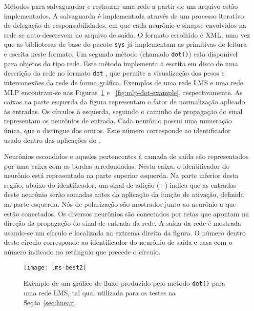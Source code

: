Métodos para salvaguardar e restaurar uma rede a partir de um arquivo es\-tão
implementados. A salvaguarda é implementada através de um processo iterativo
de delegação de responsabilidades, em que cada neurônio e sinapse envolvidos na
rede se auto-descrevem no arquivo de saída. O formato escolhido é XML, uma vez
que as bibliotecas de base do pacote \texttt{sys} já implementam as primitivas
de leitura e escrita neste formato. Um segundo método (chamado \texttt{dot()})
está disponível para objetos do tipo rede. Este método implementa a
escrita em disco de uma descrição da rede no formato \texttt{dot}
\cite{graphviz}, que permite a visualização dos pesos e interconexões da rede
de forma gráfica. Exemplos de uma rede LMS e uma rede MLP encontram-se nas
Figuras~\ref{fig:lms-dot-example} e ~\ref{fig:mlp-dot-example},
respectivamente. As caixas na parte esquerda da figura representam o fator de
normalização aplicado às entradas. Os círculos à esquerda, seguindo o caminho
de propagação do sinal representam os neurônios de entrada. Cada neurônio
possui uma numeração única, que o distingue dos outros. Este número
corresponde ao identificador usado dentro das aplicações do
. 

Neurônios escondidos e aqueles pertencentes à camada de saída são
representados por uma caixa com as bordas arredondadas. Nesta caixa, o
identificador do neurônio está representado na parte superior esquerda. Na
parte inferior desta região, abaixo do identificador, um sinal de adição ($+$)
indica que as entradas deste neurônio serão somadas antes da aplicação da
função de ativação, definida na parte esquerda. Nós de polarização são
mostrados junto ao neurônio a que estão conectados. Os diversos neurônios são
conectados por retas que apontam na direção da propagação do sinal de entrada
da rede. A saída da rede é mostrada usando-se um círculo e localizada na
extrema direita da figura. O número dentro deste círculo corresponde ao
identificador do neurônio de saída e casa com o número indicado no retângulo que
precede o círculo.

\begin{figure}
\begin{center}
\texttt{[image: lms-best2]}
\end{center}
\caption{Exemplo de um gráfico de fluxo produzido pelo método \texttt{dot()}
para uma rede LMS, tal qual utilizada para os testes na Seção~\ref{sec:linear}.}
\label{fig:lms-dot-example}
\end{figure}

